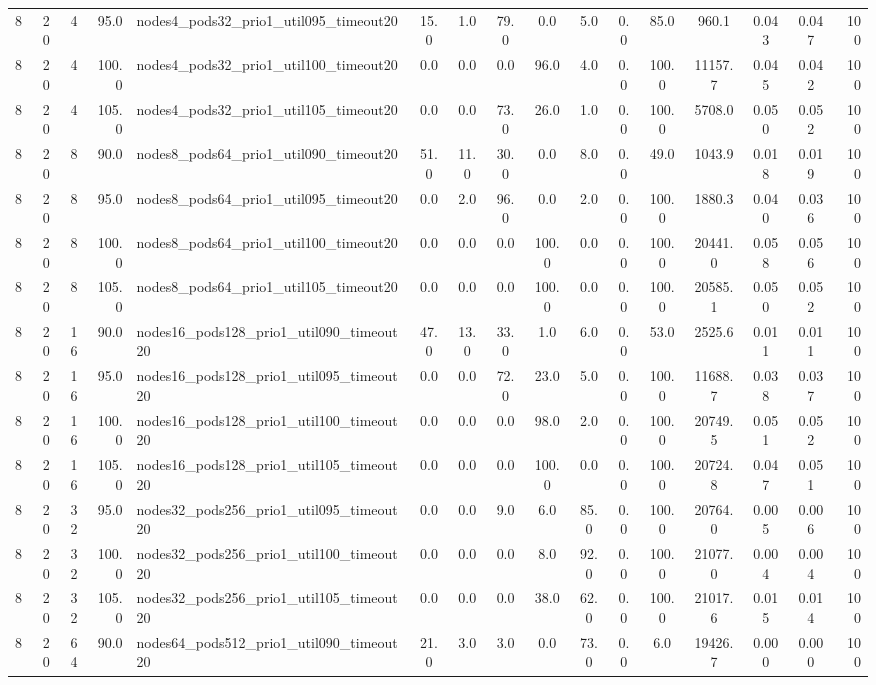 \begin{tabular}{r r r r l c c c c c c c c c c r}
8 & 20 & 4 & 95.0 & nodes4\_pods32\_prio1\_util095\_timeout20 & 15.0 & 1.0 & 79.0 & 0.0 & 5.0 & 0.0 & 85.0 & 960.1 & 0.043 & 0.047 & 100 \\
8 & 20 & 4 & 100.0 & nodes4\_pods32\_prio1\_util100\_timeout20 & 0.0 & 0.0 & 0.0 & 96.0 & 4.0 & 0.0 & 100.0 & 11157.7 & 0.045 & 0.042 & 100 \\
8 & 20 & 4 & 105.0 & nodes4\_pods32\_prio1\_util105\_timeout20 & 0.0 & 0.0 & 73.0 & 26.0 & 1.0 & 0.0 & 100.0 & 5708.0 & 0.050 & 0.052 & 100 \\
8 & 20 & 8 & 90.0 & nodes8\_pods64\_prio1\_util090\_timeout20 & 51.0 & 11.0 & 30.0 & 0.0 & 8.0 & 0.0 & 49.0 & 1043.9 & 0.018 & 0.019 & 100 \\
8 & 20 & 8 & 95.0 & nodes8\_pods64\_prio1\_util095\_timeout20 & 0.0 & 2.0 & 96.0 & 0.0 & 2.0 & 0.0 & 100.0 & 1880.3 & 0.040 & 0.036 & 100 \\
8 & 20 & 8 & 100.0 & nodes8\_pods64\_prio1\_util100\_timeout20 & 0.0 & 0.0 & 0.0 & 100.0 & 0.0 & 0.0 & 100.0 & 20441.0 & 0.058 & 0.056 & 100 \\
8 & 20 & 8 & 105.0 & nodes8\_pods64\_prio1\_util105\_timeout20 & 0.0 & 0.0 & 0.0 & 100.0 & 0.0 & 0.0 & 100.0 & 20585.1 & 0.050 & 0.052 & 100 \\
8 & 20 & 16 & 90.0 & nodes16\_pods128\_prio1\_util090\_timeout20 & 47.0 & 13.0 & 33.0 & 1.0 & 6.0 & 0.0 & 53.0 & 2525.6 & 0.011 & 0.011 & 100 \\
8 & 20 & 16 & 95.0 & nodes16\_pods128\_prio1\_util095\_timeout20 & 0.0 & 0.0 & 72.0 & 23.0 & 5.0 & 0.0 & 100.0 & 11688.7 & 0.038 & 0.037 & 100 \\
8 & 20 & 16 & 100.0 & nodes16\_pods128\_prio1\_util100\_timeout20 & 0.0 & 0.0 & 0.0 & 98.0 & 2.0 & 0.0 & 100.0 & 20749.5 & 0.051 & 0.052 & 100 \\
8 & 20 & 16 & 105.0 & nodes16\_pods128\_prio1\_util105\_timeout20 & 0.0 & 0.0 & 0.0 & 100.0 & 0.0 & 0.0 & 100.0 & 20724.8 & 0.047 & 0.051 & 100 \\
8 & 20 & 32 & 95.0 & nodes32\_pods256\_prio1\_util095\_timeout20 & 0.0 & 0.0 & 9.0 & 6.0 & 85.0 & 0.0 & 100.0 & 20764.0 & 0.005 & 0.006 & 100 \\
8 & 20 & 32 & 100.0 & nodes32\_pods256\_prio1\_util100\_timeout20 & 0.0 & 0.0 & 0.0 & 8.0 & 92.0 & 0.0 & 100.0 & 21077.0 & 0.004 & 0.004 & 100 \\
8 & 20 & 32 & 105.0 & nodes32\_pods256\_prio1\_util105\_timeout20 & 0.0 & 0.0 & 0.0 & 38.0 & 62.0 & 0.0 & 100.0 & 21017.6 & 0.015 & 0.014 & 100 \\
8 & 20 & 64 & 90.0 & nodes64\_pods512\_prio1\_util090\_timeout20 & 21.0 & 3.0 & 3.0 & 0.0 & 73.0 & 0.0 & 6.0 & 19426.7 & 0.000 & 0.000 & 100 \\

\end{tabular}
